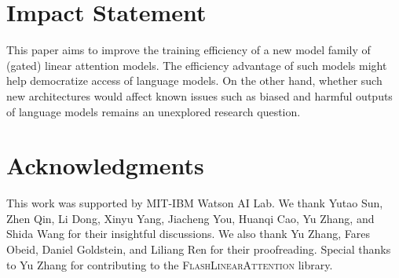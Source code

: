 \section*{Impact Statement}
%
%

This paper aims to improve the training efficiency of a new model family of (gated) linear attention models. The efficiency advantage of such models might help democratize access of language models. On the other hand, whether such new architectures would affect known issues such as biased and harmful outputs of language models remains an unexplored research question.

\section*{Acknowledgments}

This work was supported by MIT-IBM Watson AI Lab. We thank Yutao Sun, Zhen Qin, Li Dong, Xinyu Yang, Jiacheng You, Huanqi Cao, Yu Zhang, and Shida Wang for their insightful discussions. We also thank Yu Zhang, Fares Obeid, Daniel Goldstein, and Liliang Ren for their proofreading. Special thanks to Yu Zhang for contributing to the \textsc{FlashLinearAttention} library.
